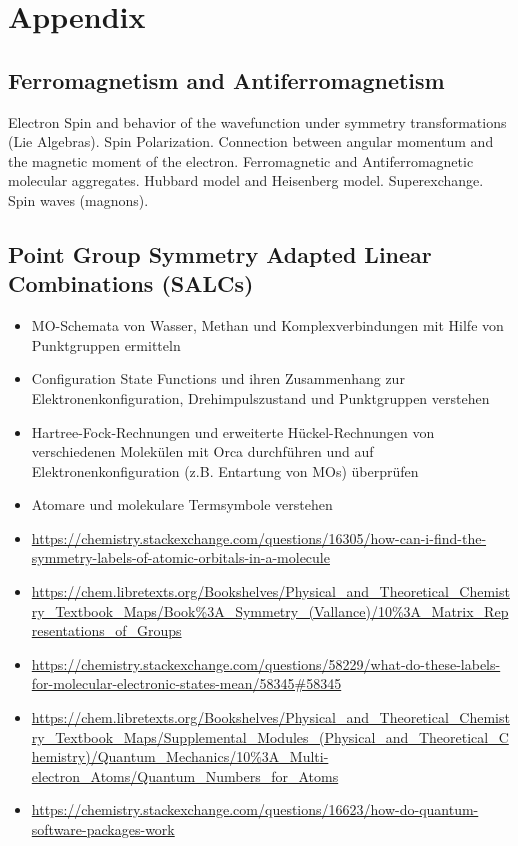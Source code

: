 \documentclass[9pt]{report}
\begin{document}
\chapter{Appendix}

\section{Ferromagnetism and Antiferromagnetism}
Electron Spin and behavior of the wavefunction under symmetry transformations (Lie Algebras). Spin Polarization. Connection between angular momentum and the magnetic moment of the electron. Ferromagnetic and Antiferromagnetic molecular aggregates. Hubbard model and Heisenberg model. Superexchange. Spin waves (magnons).



\section{Point Group Symmetry Adapted Linear Combinations (SALCs)}
\begin{itemize}
	\item MO-Schemata von Wasser, Methan und Komplexverbindungen mit Hilfe von Punktgruppen ermitteln
	\item Configuration State Functions und ihren Zusammenhang zur Elektronenkonfiguration, Drehimpulszustand und Punktgruppen verstehen
	\item Hartree-Fock-Rechnungen und erweiterte Hückel-Rechnungen von verschiedenen Molekülen mit Orca durchführen und auf Elektronenkonfiguration (z.B. Entartung von MOs) überprüfen
	\item Atomare und molekulare Termsymbole verstehen
	\item \url{https://chemistry.stackexchange.com/questions/16305/how-can-i-find-the-symmetry-labels-of-atomic-orbitals-in-a-molecule}
	\item \url{https://chem.libretexts.org/Bookshelves/Physical_and_Theoretical_Chemistry_Textbook_Maps/Book%3A_Symmetry_(Vallance)/10%3A_Matrix_Representations_of_Groups}
	\item \url{https://chemistry.stackexchange.com/questions/58229/what-do-these-labels-for-molecular-electronic-states-mean/58345#58345}
	\item \url{https://chem.libretexts.org/Bookshelves/Physical_and_Theoretical_Chemistry_Textbook_Maps/Supplemental_Modules_(Physical_and_Theoretical_Chemistry)/Quantum_Mechanics/10%3A_Multi-electron_Atoms/Quantum_Numbers_for_Atoms}
	\item 
	\url{https://chemistry.stackexchange.com/questions/16623/how-do-quantum-software-packages-work}
\end{itemize}
\end{document}
